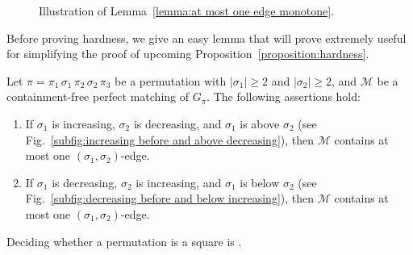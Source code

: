 \documentclass[a4paper]{llncs}
\begin{document}
\begin{figure}[t!]
{
      \label{subfig:decreasing before and below increasing}
    }%
    \caption{\label{fig:subfig:no (nu_1, nu_2)-edge}%
      Illustration of Lemma~\ref{lemma:at most one edge monotone}.
    }
  \end{figure}

Before proving hardness, we give an easy lemma that will prove extremely
useful for simplifying the proof of upcoming
Proposition~\ref{proposition:hardness}.

\begin{lemma}
  \label{lemma:at most one edge monotone}
  Let $\pi = \pi_1 \, \sigma_1 \, \pi_2 \, \sigma_2 \, \pi_3$
  be a permutation with $|\sigma_1| \geq 2$ and $|\sigma_2| \geq 2$,
  and $\mathcal{M}$ be a containment-free perfect matching of $G_\pi$.
  The following assertions hold:
  \begin{enumerate}
    \item
    If $\sigma_1$ is increasing, $\sigma_2$ is decreasing, and
    $\sigma_1$ is above $\sigma_2$ (see Fig.~\ref{subfig:increasing before
    and above decreasing}), then $\mathcal{M}$ contains at most one
    $(\sigma_1, \sigma_2)$-edge.
    \item
    If $\sigma_1$ is decreasing, $\sigma_2$ is increasing, and $\sigma_1$
    is below $\sigma_2$ (see Fig.~\ref{subfig:decreasing before and below
    increasing}), then $\mathcal{M}$ contains at most one
    $(\sigma_1, \sigma_2)$-edge.
  \end{enumerate}
\end{lemma}

\begin{proposition}
  \label{proposition:hardness}
  Deciding whether a permutation is a square is \NPC.
\end{proposition}
\end{document}
